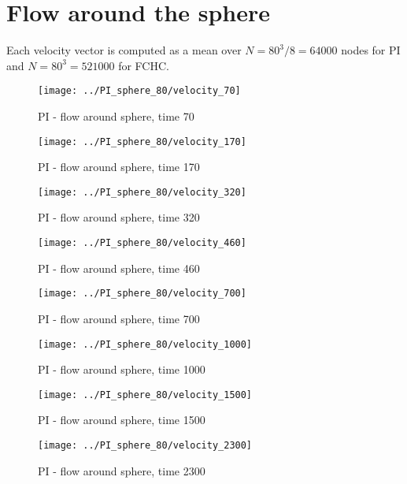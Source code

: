 \section{Flow around the sphere} 
Each velocity vector is computed as a mean over $N = 80^3 / 8 = 64000$ nodes for PI and $N = 80^3 = 521 000$ for FCHC.

\begin{figure}[H]
 \centering 
 \texttt{[image: ../PI\_sphere\_80/velocity\_70]}
 \label{transitions}
 \caption{PI - flow around sphere, time 70}
\end{figure}


\begin{figure}[H]
 \centering 
 \texttt{[image: ../PI\_sphere\_80/velocity\_170]}
 \label{transitions}
 \caption{PI - flow around sphere, time 170}
\end{figure}


\begin{figure}[H]
 \centering 
 \texttt{[image: ../PI\_sphere\_80/velocity\_320]}
 \label{transitions}
 \caption{PI - flow around sphere, time 320}
\end{figure}


\begin{figure}[H]
 \centering 
 \texttt{[image: ../PI\_sphere\_80/velocity\_460]}
 \label{transitions}
 \caption{PI - flow around sphere, time 460}
\end{figure}


\begin{figure}[H]
 \centering 
 \texttt{[image: ../PI\_sphere\_80/velocity\_700]}
 \label{transitions}
 \caption{PI - flow around sphere, time 700}
\end{figure}


\begin{figure}[H]
 \centering 
 \texttt{[image: ../PI\_sphere\_80/velocity\_1000]}
 \label{transitions}
 \caption{PI - flow around sphere, time 1000}
\end{figure}


\begin{figure}[H]
 \centering 
 \texttt{[image: ../PI\_sphere\_80/velocity\_1500]}
 \label{transitions}
 \caption{PI - flow around sphere, time 1500}
\end{figure}


\begin{figure}[H]
 \centering 
 \texttt{[image: ../PI\_sphere\_80/velocity\_2300]}
 \label{transitions}
 \caption{PI - flow around sphere, time 2300}
\end{figure}


